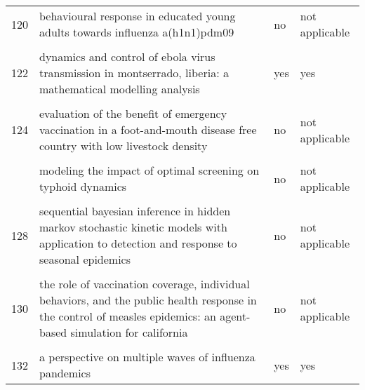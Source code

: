\documentclass[
]{article}
\begin{document}
\begin{landscape}
\begin{longtable}{l>{\raggedright\arraybackslash}p{9cm}ll}
120 & behavioural response in educated young adults towards influenza a(h1n1)pdm09 & no & not applicable\\
\addlinespace
\cellcolor{gray!6}{121} & \cellcolor{gray!6}{cover your cough! quantifying the benefits of a localized healthy behavior intervention on flu epidemics in washington dc} & \cellcolor{gray!6}{no} & \cellcolor{gray!6}{not applicable}\\
122 & dynamics and control of ebola virus transmission in montserrado, liberia: a mathematical modelling analysis & yes & yes\\
\cellcolor{gray!6}{123} & \cellcolor{gray!6}{estimating the effectiveness of early control measures through school absenteeism surveillance in observed outbreaks at rural schools in hubei, china} & \cellcolor{gray!6}{yes} & \cellcolor{gray!6}{yes}\\
124 & evaluation of the benefit of emergency vaccination in a foot-and-mouth disease free country with low livestock density & no & not applicable\\
\cellcolor{gray!6}{125} & \cellcolor{gray!6}{modeling the dynamics of oral poliovirus vaccine cessation} & \cellcolor{gray!6}{no} & \cellcolor{gray!6}{not applicable}\\
\addlinespace
126 & modeling the impact of optimal screening on typhoid dynamics & no & not applicable\\
\cellcolor{gray!6}{127} & \cellcolor{gray!6}{modeling the influence of environment and intervention oncholera in haiti} & \cellcolor{gray!6}{yes} & \cellcolor{gray!6}{yes}\\
128 & sequential bayesian inference in hidden markov stochastic kinetic models with application to detection and response to seasonal epidemics & no & not applicable\\
\cellcolor{gray!6}{129} & \cellcolor{gray!6}{simulating optimal vaccination times during cholera outbreaks} & \cellcolor{gray!6}{no} & \cellcolor{gray!6}{not applicable}\\
130 & the role of vaccination coverage, individual behaviors, and the public health response in the control of measles epidemics: an agent-based simulation for california & no & not applicable\\
\addlinespace
\cellcolor{gray!6}{131} & \cellcolor{gray!6}{time is (still) of the essence: quantifying the impact of emergency meningitis vaccination response in katsina state, nigeria} & \cellcolor{gray!6}{yes} & \cellcolor{gray!6}{no}\\
132 & a perspective on multiple waves of influenza pandemics & yes & yes\\

\end{longtable}
\end{landscape}
\end{document}
